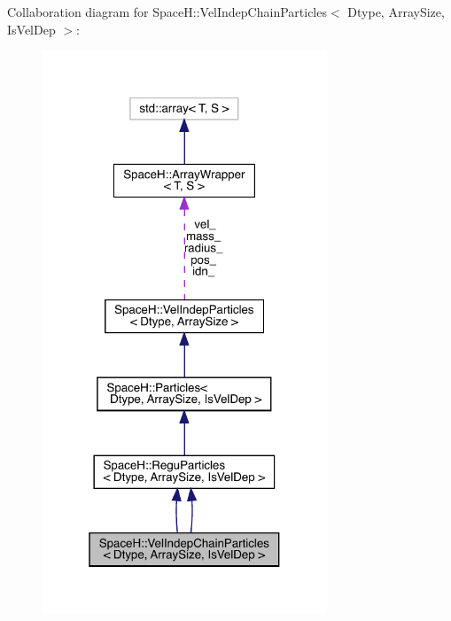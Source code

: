 Collaboration diagram for SpaceH\+:\+:Vel\+Indep\+Chain\+Particles$<$ Dtype, Array\+Size, Is\+Vel\+Dep $>$\+:
\nopagebreak
\begin{figure}[H]
\begin{center}
\leavevmode
\includegraphics[width=241pt]{class_space_h_1_1_vel_indep_chain_particles__coll__graph}
\end{center}
\end{figure}
